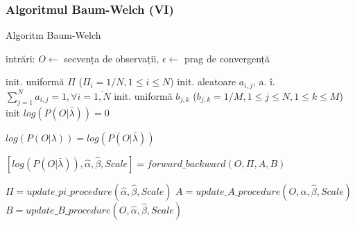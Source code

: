\begin{frame}[fragile, t]
	\frametitle{Algoritmul Baum-Welch (VI)}	
	\begin{algorithm}[H]
		\scriptsize
      	\caption{Algoritm Baum-Welch}
      	\label{alg-baum-welch}
      	 
      	\begin{algorithmic}[1]
      		\STATE intrări: $O \leftarrow$ secvența de observații, $\epsilon \leftarrow$ prag de convergență
      		
      		\STATE {}
      		\STATE init. uniformă $\Pi$ ($\Pi_i = 1/N, 1 \le i \le N$)
      		\STATE init. aleatoare $a_{i,j}$, a. î. $\sum_{j=1}^{N}a_{i,j} = 1, \forall{i} = \bar{1, N}$ 
      		\STATE init. uniformă $b_{j,k}$ ($b_{j,k} = 1/M, 1 \le j \le N, 1 \le k \le M$)
      		\STATE init $log(P(O \vert \bar{\lambda})) = 0$
			\vspace*{0.5em}
      		
      		\REPEAT
				\STATE $log(P(O \vert \lambda)) = log(P(O \vert \bar{\lambda}))$
				
      			\STATE {}
				\STATE $[log(P(O \vert \bar{\lambda})), \hat{\alpha}, \hat{\beta}, Scale] 
				= forward\_backward(O, \Pi, A, B)$
				
				\STATE {}
				\STATE $\Pi = update\_pi\_procedure(\hat{\alpha}, \hat{\beta}, Scale)$
				\STATE $A = update\_A\_procedure(O, \hat{\alpha}, \hat{\beta}, Scale)$
				\STATE $B = update\_B\_procedure(O, \hat{\alpha}, \hat{\beta}, Scale)$
				
		\end{algorithmic}
	\end{algorithm}  
\end{frame}


